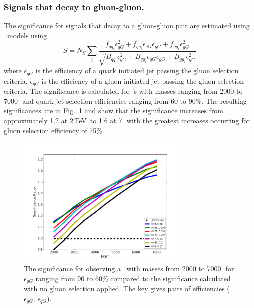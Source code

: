 \subsubsection{Signals that decay to gluon-gluon.}

The significance for signals that decay to a gluon-gluon pair are estimated using \Hprime\ models  using 
\begin{equation}
S = N_S \sum_i{ \dfrac{ f_{{qq}_i}\epsilon_{qG}^2 + f_{{qg}_i}\epsilon_{qG}\epsilon_{gG} + f_{{gg}_i}\epsilon_{gG}^2  } {\sqrt{ B_{{qq}_i}\epsilon_{qG}^2 + B_{{qg}_i}\epsilon_{qG}\epsilon_{gG} + B_{{gg}_i}\epsilon_{gG}^2  }}}
\end{equation}
where  
$\epsilon_{qG}$ is the efficiency of a quark initiated jet passing the gluon selection criteria, 
$\epsilon_{gG}$ is the efficiency of a gluon initiated jet passing the gluon selection criteria. 
The significance is calculated for \Hprime's with masses ranging from 2000 to 7000\,\GeV\ and quark-jet selection 
efficiencies ranging from 60 to 90\%. The resulting significances are  in Fig.~\ref{fig:GluonSignalSignificance}
and show that the significance increases from approximately 1.2 at 2\,TeV\ to 1.6 at 7\,\TeV\ with the greatest 
increases  occurring for gluon selection efficiency of 75\%. 

\begin{figure}[htb]
 \centering
\includegraphics[width=0.75\textwidth]{figures/tagging/GluonSignalSignificance.png}
\caption{ The significance for observing a \Hprime\ with masses from 2000 to 7000\,\GeV\ 
for $\epsilon_{gG}$ ranging from 90 to 60\% compared to the significance calculated with no gluon selection applied. The key gives pairs of efficiencies ($\epsilon_{gG}$, $\epsilon_{qG}$).
  \label{fig:GluonSignalSignificance}}
\end{figure}


